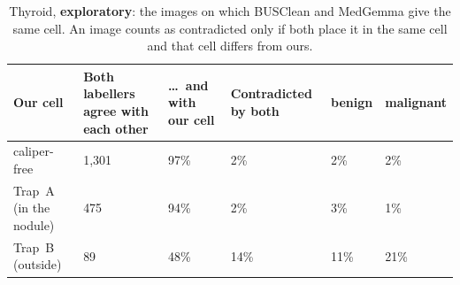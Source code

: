 \begin{table}[H]\centering\scriptsize
\caption{Thyroid, \textbf{exploratory}: the images on which BUSClean and MedGemma give the same cell. An image counts as contradicted only if both place it in the same cell and that cell differs from ours.}\label{tab:thycons}
\begin{tabular}{p{3.4cm}p{2.4cm}p{2.0cm}p{2.0cm}p{1.4cm}p{1.4cm}}\toprule
Our cell & Both labellers agree with each other & \ldots\ and with our cell & Contradicted by both & benign & malignant \\\midrule
caliper-free & 1{,}301 & 97\% & 2\% & 2\% & 2\% \\
Trap~A (in the nodule) & 475 & 94\% & 2\% & 3\% & 1\% \\
Trap~B (outside) & 89 & 48\% & 14\% & 11\% & 21\% \\
\bottomrule\end{tabular}
\end{table}

